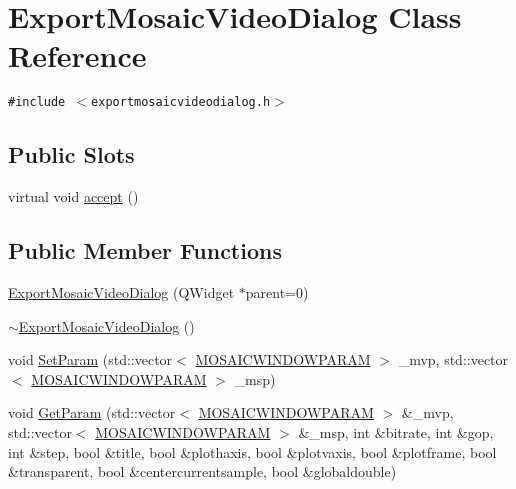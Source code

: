 \hypertarget{class_export_mosaic_video_dialog}{
\section{ExportMosaicVideoDialog Class Reference}
\label{class_export_mosaic_video_dialog}
}
{\tt \#include $<$exportmosaicvideodialog.h$>$}

\subsection*{Public Slots}
\begin{CompactItemize}
\item 
virtual void \hyperlink{class_export_mosaic_video_dialog_04899feff2347268ac804db6e4312993}{accept} ()
\end{CompactItemize}
\subsection*{Public Member Functions}
\begin{CompactItemize}
\item 
\hyperlink{class_export_mosaic_video_dialog_b82411d35d97e6685b3b5f21b9bcd7da}{ExportMosaicVideoDialog} (QWidget $\ast$parent=0)
\item 
\hyperlink{class_export_mosaic_video_dialog_0aef55cc90e005b61353bc0aae814a93}{$\sim$ExportMosaicVideoDialog} ()
\item 
void \hyperlink{class_export_mosaic_video_dialog_90a280c0cc8cd6edbd5ce811ebaf76a7}{SetParam} (std::vector$<$ \hyperlink{struct_m_o_s_a_i_c_w_i_n_d_o_w_p_a_r_a_m}{MOSAICWINDOWPARAM} $>$ \_\-mvp, std::vector$<$ \hyperlink{struct_m_o_s_a_i_c_w_i_n_d_o_w_p_a_r_a_m}{MOSAICWINDOWPARAM} $>$ \_\-msp)
\item 
void \hyperlink{class_export_mosaic_video_dialog_1734cda9e540bf140c1d3b1db5ecb67b}{GetParam} (std::vector$<$ \hyperlink{struct_m_o_s_a_i_c_w_i_n_d_o_w_p_a_r_a_m}{MOSAICWINDOWPARAM} $>$ \&\_\-mvp, std::vector$<$ \hyperlink{struct_m_o_s_a_i_c_w_i_n_d_o_w_p_a_r_a_m}{MOSAICWINDOWPARAM} $>$ \&\_\-msp, int \&bitrate, int \&gop, int \&step, bool \&title, bool \&plothaxis, bool \&plotvaxis, bool \&plotframe, bool \&transparent, bool \&centercurrentsample, bool \&globaldouble)
\end{CompactItemize}
